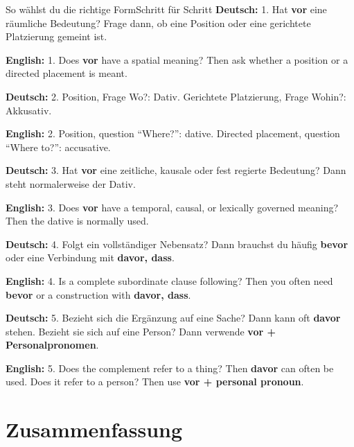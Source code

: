\documentclass[a4paper,11pt]{article}
\newcommand{\GermanText}[1]{\textbf{Deutsch: }#1\par}
\newcommand{\EnglishText}[1]{{\small\color{SoftGray}\textbf{English: }#1\par}}
\begin{document}
        \begin{grammarentry}{So wählst du die richtige Form}{Schritt für Schritt}
            \GermanText{1. Hat \textbf{vor} eine räumliche Bedeutung? Frage dann, ob eine Position oder eine gerichtete Platzierung gemeint ist.}
            \EnglishText{1. Does \textbf{vor} have a spatial meaning? Then ask whether a position or a directed placement is meant.}

            \GermanText{2. Position, Frage \glqq Wo?\grqq: Dativ. Gerichtete Platzierung, Frage \glqq Wohin?\grqq: Akkusativ.}
            \EnglishText{2. Position, question ``Where?'': dative. Directed placement, question ``Where to?'': accusative.}

            \GermanText{3. Hat \textbf{vor} eine zeitliche, kausale oder fest regierte Bedeutung? Dann steht normalerweise der Dativ.}
            \EnglishText{3. Does \textbf{vor} have a temporal, causal, or lexically governed meaning? Then the dative is normally used.}

            \GermanText{4. Folgt ein vollständiger Nebensatz? Dann brauchst du häufig \textbf{bevor} oder eine Verbindung mit \textbf{davor, dass}.}
            \EnglishText{4. Is a complete subordinate clause following? Then you often need \textbf{bevor} or a construction with \textbf{davor, dass}.}

            \GermanText{5. Bezieht sich die Ergänzung auf eine Sache? Dann kann oft \textbf{davor} stehen. Bezieht sie sich auf eine Person? Dann verwende \textbf{vor + Personalpronomen}.}
            \EnglishText{5. Does the complement refer to a thing? Then \textbf{davor} can often be used. Does it refer to a person? Then use \textbf{vor + personal pronoun}.}
        \end{grammarentry}


    \section{Zusammenfassung}
\end{document}
